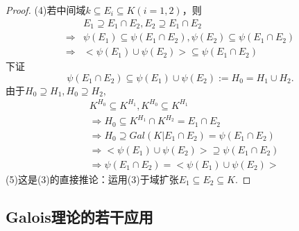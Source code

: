 \documentclass[UTF8]{article}
\begin{document}
\begin{proof}
	(4)若中间域$k\subseteq E_{i}\subseteq K(i=1,2)$，则
	\[
	\begin{split}
	&E_{1}\supseteq E_{1}\cap E_{2},E_{2}\supseteq E_{1}\cap E_{2}\\
	\Rightarrow&\psi(E_{1})\subseteq \psi(E_{1}\cap E_{2}),\psi(E_{2})\subseteq \psi(E_{1}\cap E_{2})\\
	\Rightarrow&<\psi(E_{1})\cup \psi(E_{2})>\subseteq \psi(E_{1}\cap E_{2})
	\end{split}
	\]
	下证
	$$
	\psi(E_{1}\cap E_{2})\subseteq \psi(E_{1})\cup \psi(E_{2}):=H_{0}=H_{1}\cup H_{2}.
	$$
	由于$H_{0}\supseteq H_{1},H_{0}\supseteq H_{2},$
	\[
	\begin{split}
	&K^{H_{0}}\subseteq K^{H_{1}},K^{H_{0}}\subseteq K^{H_{1}}\\
	&\Rightarrow H_{0}\subseteq K^{H_{1}}\cap K^{H_{2}}=E_{1}\cap E_{2}\\
	&\Rightarrow H_{0}\supseteq Gal(K|E_{1}\cap E_{2})=\psi(E_{1}\cap E_{2})\\
	&\Rightarrow< \psi(E_{1})\cup \psi(E_{2})>\supseteq  \psi(E_{1}\cap E_{2})\\
	&\Rightarrow\psi(E_{1}\cap E_{2})=< \psi(E_{1})\cup \psi(E_{2})>
	\end{split}
	\]
	(5)这是(3)的直接推论：运用(3)于域扩张$E_{1}\subseteq E_{2}\subseteq K.$
\end{proof}
\subsection{Galois理论的若干应用}
\end{document}
